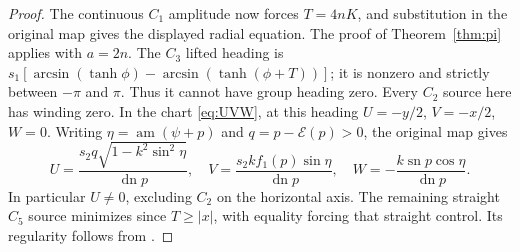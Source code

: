 \documentclass[11pt,a4paper]{article}
\theoremstyle{remark}\newtheorem{remark}[theorem]{Remark}
\newcommand{\sn}{\operatorname{sn}}
\newcommand{\dn}{\operatorname{dn}}
\begin{document}
\begin{proof}
The continuous $C_1$ amplitude now forces $T=4nK$, and substitution in
the original map gives the displayed radial equation. The proof of
Theorem~\ref{thm:pi} applies with $a=2n$. The $C_3$ lifted heading is
$s_1[\arcsin(\tanh\phi)-\arcsin(\tanh(\phi+T))]$; it is nonzero and
strictly between $-\pi$ and $\pi$. Thus it cannot have group heading zero.
Every $C_2$ source here has winding zero. In the chart
\eqref{eq:UVW}, at this heading $U=-y/2$, $V=-x/2$, $W=0$.
Writing $\eta=\operatorname{am}(\psi+p)$ and $q=p-\mathcal E(p)>0$,
the original map gives
\begin{equation}\label{eq:zero-full-chart}
 U=\frac{s_2q\sqrt{1-k^2\sin^2\eta}}{\dn p},\quad
 V=\frac{s_2k f_1(p)\sin\eta}{\dn p},\quad
 W=-\frac{k\sn p\cos\eta}{\dn p}.
\end{equation}
In particular $U\ne0$, excluding $C_2$ on the horizontal axis.
The remaining straight $C_5$ source minimizes since $T\ge|x|$, with
equality forcing that straight control. Its regularity follows from
\cite[Theorem 2.4]{SC}.


\end{proof}
\end{document}
